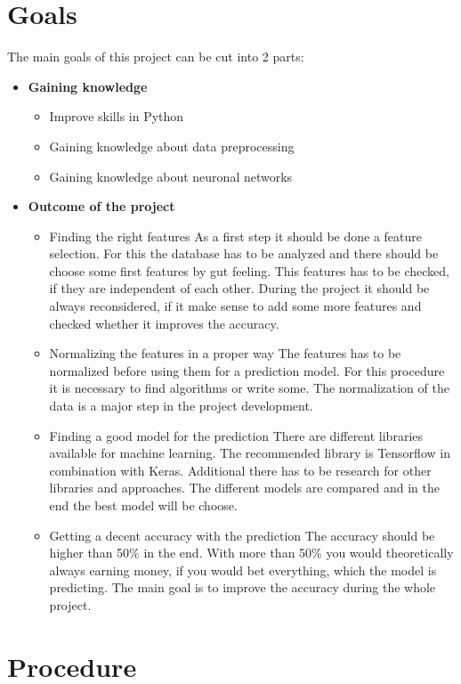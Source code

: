 \section{Goals}
The main goals of this project can be cut into 2 parts:
\begin{itemize}
	\item \textbf{Gaining knowledge}
		\begin{itemize}
			\item Improve skills in Python
			\item Gaining knowledge about data preprocessing 
			\item Gaining knowledge about neuronal networks
		\end{itemize}
	\item \textbf{Outcome of the project}
		\begin{itemize}
			\item Finding the right features \newline
			As a first step it should be done a feature selection. For this the database has to be analyzed and there should be choose some first features by gut feeling. This features has to be checked, if they are independent of each other. During the project it should be always reconsidered, if it make sense to add some more features and checked whether it improves the accuracy. 
			\item Normalizing the features in a proper way \newline
			The features has to be normalized before using them for a prediction model. For this procedure it is necessary to find algorithms or write some. The normalization of the data is a major step in the project development.
			\item Finding a good model for the prediction 
			There are different libraries available for machine learning. The recommended library is Tensorflow in combination with Keras. Additional there has to be research for other libraries and approaches. The different models are compared and in the end the best model will be choose. 
			\item Getting a decent accuracy with the prediction \newline
			The accuracy should be higher than 50\% in the end. With more than 50\% you would theoretically always earning money, if you would bet everything, which the model is predicting. The main goal is to improve the accuracy during the whole project. 
		\end{itemize}
\end{itemize}
\section{Procedure}
